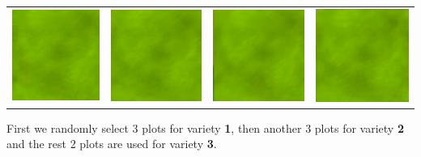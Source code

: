 \documentclass[11pt, a4paper]{article}\usepackage[]{graphicx}\usepackage[]{xcolor}
\begin{document}
\begin{table}[H]
\begin{center}
\begin{tabular}{cccc}
\includegraphics[scale = 0.51]{plot 5} & \includegraphics[scale = 0.5]{plot 6} & \includegraphics[scale = 0.5]{plot 7} & \includegraphics[scale = 0.5]{plot 8}\\
\end{tabular}

\end{center}

\end{table}


First we randomly select 3 plots for variety \textbf{1}, then another 3 plots for variety \textbf{2} and the rest 2 plots are used for variety \textbf{3}.
\end{document}
